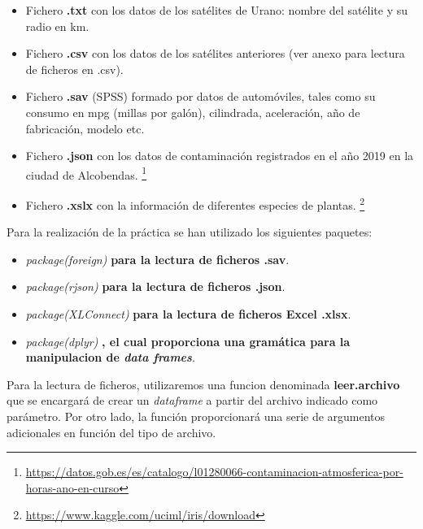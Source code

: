 \documentclass [a4paper] {article}
\begin{document}
\begin{itemize}
	\item Fichero \textbf{.txt} con los datos de los satélites de Urano: nombre del satélite y su radio en km.
	\item Fichero \textbf{.csv} con los datos de los satélites anteriores (ver anexo para lectura de ficheros en .csv).
	\item Fichero \textbf{.sav} (SPSS) formado por datos de automóviles, tales como su consumo en mpg (millas por galón), cilindrada, aceleración, año de fabricación, modelo etc.
	\item Fichero \textbf{.json} con los datos de contaminación registrados en el año 2019 en la ciudad de Alcobendas. \footnote{\url{https://datos.gob.es/es/catalogo/l01280066-contaminacion-atmosferica-por-horas-ano-en-curso}}
	\item Fichero \textbf{.xslx} con la información de diferentes especies de plantas. \footnote{\url{https://www.kaggle.com/uciml/iris/download}}
\end{itemize}
\newpage
Para la realización de la práctica se han utilizado los siguientes paquetes:
\begin{itemize}
	\item \textit{package(foreign)} \textbf{para la lectura de ficheros .sav}.
	\item \textit{package(rjson)} \textbf{para la lectura de ficheros .json}.
	\item \textit{package(XLConnect)} \textbf{para la lectura de ficheros Excel .xlsx}.
	\item \textit{package(dplyr)} \textbf{, el cual proporciona una gramática para la manipulacion de \textit{data frames}}.
\end{itemize}

Para la lectura de ficheros, utilizaremos una funcion denominada \textbf{leer.archivo} que se encargará
de crear un \textit{dataframe} a partir del archivo indicado como parámetro. Por otro lado, la función
proporcionará una serie de argumentos adicionales en función del tipo de archivo.
\end{document}
